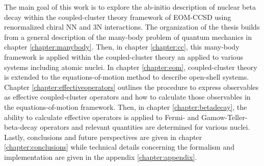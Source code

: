 \documentclass[../thesis.tex]{subfiles}
\begin{document}
The main goal of this work is to explore the ab-initio description of nuclear beta decay within the coupled-cluster theory framework of EOM-CCSD using renormalized chiral NN and 3N interactions.  The organization of the thesis builds from a general description of the many-body problem of quantum mechanics in chapter \ref{chapter:manybody}. Then, in chapter \ref{chapter:cc}, this many-body framework is applied within the coupled-cluster theory an applied to various systems including atomic nuclei. In chapter \ref{chapter:eom}, coupled-cluster theory is extended to the equations-of-motion method to describe open-shell systems.  Chapter \ref{chapter:effectiveoperators} outlines the procedure to express observables as effective coupled-cluster operators and how to calculate those observables in the equations-of-motion framework.  Then, in chapter \ref{chapter:betadecay}, the ability to calculate effective operators is applied to Fermi- and Gamow-Teller- beta-decay operators and relevant quantities are determined for various nuclei.  Lastly, conclusions and future perspectives are given in chapter \ref{chapter:conclusions} while technical details concerning the formalism and implementation are given in the appendix \ref{chapter:appendix}.
\end{document}
